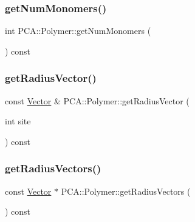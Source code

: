 \hypertarget{class_p_c_a_1_1_polymer_a5c87b083f77c06ffd14278f87dad47ea}{}\label{class_p_c_a_1_1_polymer_a5c87b083f77c06ffd14278f87dad47ea} 
\subsubsection{\texorpdfstring{get\+Num\+Monomers()}{getNumMonomers()}}
{\footnotesize\ttfamily int P\+C\+A\+::\+Polymer\+::get\+Num\+Monomers (\begin{DoxyParamCaption}{ }\end{DoxyParamCaption}) const\hspace{0.3cm}{\ttfamily [inline]}}

\hypertarget{class_p_c_a_1_1_polymer_ab2ea86763e0f0be646ef6aa6a105f927}{}\label{class_p_c_a_1_1_polymer_ab2ea86763e0f0be646ef6aa6a105f927} 
\subsubsection{\texorpdfstring{get\+Radius\+Vector()}{getRadiusVector()}}
{\footnotesize\ttfamily const \hyperlink{class_p_c_a_1_1_vector}{Vector} \& P\+C\+A\+::\+Polymer\+::get\+Radius\+Vector (\begin{DoxyParamCaption}\item[{int}]{site }\end{DoxyParamCaption}) const}

\hypertarget{class_p_c_a_1_1_polymer_a6e913f9b50a164c828f9a3cb89e452e1}{}\label{class_p_c_a_1_1_polymer_a6e913f9b50a164c828f9a3cb89e452e1} 
\subsubsection{\texorpdfstring{get\+Radius\+Vectors()}{getRadiusVectors()}}
{\footnotesize\ttfamily const \hyperlink{class_p_c_a_1_1_vector}{Vector} $\ast$ P\+C\+A\+::\+Polymer\+::get\+Radius\+Vectors (\begin{DoxyParamCaption}{ }\end{DoxyParamCaption}) const}


